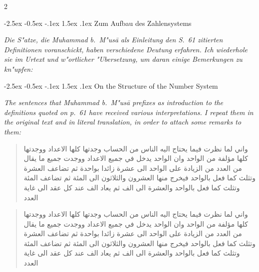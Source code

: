 \documentclass[10pt,a4paper]{article}
\makeatletter
\newcommand{\RL}[1]{\beginR#1\endR}
\newcommand{\ar}[1]{{\arabicfont\RL{#1}}}
\renewcommand{\section}{\@startsection{section}{1}{\z@}%
  {-2.5ex \@plus -0.5ex \@minus -.1ex}%
  {1.5ex \@plus .1ex}%
  {\normalfont\large\bfseries\color{sectioncolor}}}
\makeatother
\begin{document}
\begin{paracol}{2}

\section{Zum Aufbau des Zahlensystems}

\textit{Die S"atze, die Muhammad b.\ M"us\=a als Einleitung den S.\ 61 zitierten Definitionen voranschickt, haben verschiedene Deutung erfahren. Ich wiederhole sie im Urtext und w"ortlicher "Ubersetzung, um daran einige Bemerkungen zu kn"upfen:}

\switchcolumn

\section{On the Structure of the Number System}

\textit{The sentences that Muhammad b.\ M"us\=a prefixes as introduction to the definitions quoted on p.\ 61 have received various interpretations. I repeat them in the original text and in literal translation, in order to attach some remarks to them:}

\switchcolumn*

\begin{quote}
\ar{واني لما نظرت فيما يحتاج اليه الناس من الحساب وجدتها كلها الاعداد ووجدتها كلها مؤلفة من الواحد وان الواحد يدخل في جميع الاعداد ووجدت جميع ما يقال من العدد من الزيادة على الواحد الى عشرة زائدا بواحدة ثم تضاعف العشرة وتثلث كما فعل بالواحد فيخرج منها العشرون والثلاثون الى المئة ثم تضاعف المئة وتثلث كما فعل بالواحد والعشرة الى الف ثم يعاد الف عند كل عقد الى غاية العدد}
\end{quote}

\switchcolumn

\begin{quote}
\ar{واني لما نظرت فيما يحتاج اليه الناس من الحساب وجدتها كلها الاعداد ووجدتها كلها مؤلفة من الواحد وان الواحد يدخل في جميع الاعداد ووجدت جميع ما يقال من العدد من الزيادة على الواحد الى عشرة زائدا بواحدة ثم تضاعف العشرة وتثلث كما فعل بالواحد فيخرج منها العشرون والثلاثون الى المئة ثم تضاعف المئة وتثلث كما فعل بالواحد والعشرة الى الف ثم يعاد الف عند كل عقد الى غاية العدد}
\end{quote}

\switchcolumn*


\end{paracol}
\end{document}
